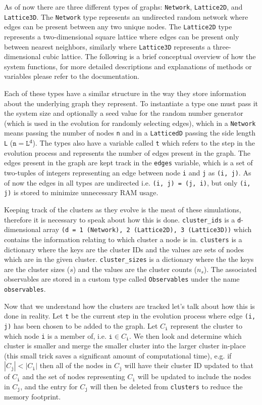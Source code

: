 As of now there are three different types of graphs: \texttt{Network}, \texttt{Lattice2D}, and \texttt{Lattice3D}.
The \texttt{Network} type represents an undirected random network where edges can be present between any two unique nodes.
The \texttt{Lattice2D} type represents a two-dimensional square lattice where edges can be present only between nearest neighbors, similarly where \texttt{Lattice3D} represents a three-dimensional cubic lattice.
The following is a brief conceptual overview of how the system functions, for more detailed descriptions and explanations of methods or variables please refer to the documentation.

Each of these types have a similar structure in the way they store information about the underlying graph they represent.
To instantiate a type one must pass it the system size and optionally a seed value for the random number generator (which is used in the evolution for randomly selecting edges), which in a \texttt{Network} means passing the number of nodes \texttt{n} and in a \texttt{LatticedD} passing the side length \texttt{L} ($\texttt{n} = \texttt{L}^\texttt{d}$).
The types also have a variable called \texttt{t} which refers to the step in the evolution process and represents the number of edges present in the graph.
The edges present in the graph are kept track in the \texttt{edges} variable, which is a set of two-tuples of integers representing an edge between node \texttt{i} and \texttt{j} as \texttt{(i, j)}.
As of now the edges in all types are undirected i.e. \texttt{(i, j) = (j, i)}, but only \texttt{(i, j)} is stored to minimize unnecessary RAM usage.

Keeping track of the clusters as they evolve is the meat of these simulations, therefore it is necessary to speak about how this is done.
\texttt{cluster\_ids} is a \texttt{d}-dimensional array \texttt{(d = 1 (Network), 2 (Lattice2D), 3 (Lattice3D))} which contains the information relating to which cluster a node is in.
\texttt{clusters} is a dictionary where the keys are the cluster IDs and the values are sets of nodes which are in the given cluster.
\texttt{cluster\_sizes} is a dictionary where the the keys are the cluster sizes ($s$) and the values are the cluster counts ($n_s$).
The associated observables are stored in a custom type called \texttt{Observables} under the name \texttt{observables}.

Now that we understand how the clusters are tracked let's talk about how this is done in reality.
Let \texttt{t} be the current step in the evolution process where edge \texttt{(i, j)} has been chosen to be added to the graph.
Let $C_\texttt{i}$ represent the cluster to which node \texttt{i} is a member of, i.e. $\texttt{i} \in C_\texttt{i}$.
We then look and determine which cluster is smaller and merge the smaller cluster into the larger cluster in-place (this small trick saves a significant amount of computational time), e.g. if $|C_\texttt{j}| < |C_\texttt{i}|$ then all of the nodes in $C_\texttt{j}$ will have their cluster ID updated to that of $C_\texttt{i}$ and the set of nodes representing $C_\texttt{i}$ will be updated to include the nodes in $C_\texttt{j}$, and the entry for $C_\texttt{j}$ will then be deleted from \texttt{clusters} to reduce the memory footprint.

